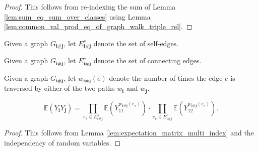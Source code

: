 \begin{proof}
  This follows from re-indexing the sum of Lemma \ref{lem:sum_eq_sum_over_classes} using Lemma \ref{lem:common_val_prod_eq_of_graph_walk_triple_rel}.
\end{proof}
\begin{definition}
  \notready
  \label{def:graph_walk_triple_single_edges}
  Given a graph $G_{\mathbf{i} \# \mathbf{j}}$, let $E^s_{\mathbf{i} \# \mathbf{j}}$ denote the set of self-edges.
\end{definition}
\begin{definition}
  \notready
  \label{def:graph_walk_triple_repeated_edges} %
  Given a graph $G_{\mathbf{i} \# \mathbf{j}}$, let $E^c_{\mathbf{i} \# \mathbf{j}}$ denote the set of connecting edges.
\end{definition}
\begin{definition}
  \notready
  \label{def:edgeCountPair}
  Given a graph $G_{\mathbf{i} \# \mathbf{j}}$, 
  let $w_{\mathbf{i} \# \mathbf{j}}(e)$ denote the number of times the edge $e$ is traversed by either of the two paths $w_\mathbf{i}$ and $w_\mathbf{j}$.
\end{definition}
\begin{lemma}
  \notready
  \label{lem:expect_mul_eq_prod_expect_edgewise_of_indep}
  \[
  \mathbb{E} (Y_\mathbf{i}Y_\mathbf{j}) 
  = \prod_{e_s \in E^s_{\mathbf{i} \# \mathbf{j}}} \mathbb{E} (Y_{11}^{w_{\mathbf{i} \# \mathbf{j}}(e_s)}) \cdot \prod_{e_c \in E^c_{\mathbf{i} \# \mathbf{j}}} \mathbb{E} (Y_{12}^{w_{\mathbf{i} \# \mathbf{j}}(e_c)}).
  \]
\end{lemma}
\begin{proof}
  This follows from Lemma \ref{lem:expectation_matrix_multi_index} and the independency of random variables.
\end{proof}
  \notready
  \label{lem:expect_mul_eq_prod_expect_edgewise_mul_prod_expect_edgewise}
